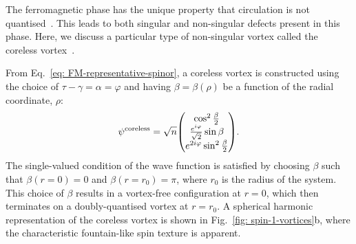 The ferromagnetic phase has the unique property that circulation is not
quantised~\cite{Kawaguchi2012}.
This leads to both singular and non-singular defects present in this phase.
Here, we discuss a particular type of non-singular vortex called the coreless
vortex~\cite{Martikainen2002, Leanhardt2003}.

From Eq.~\eqref{eq: FM-representative-spinor}, a coreless vortex is constructed
using the choice of \(\tau-\gamma = \alpha= \varphi \) and having
\(\beta = \beta(\rho)\) be a function of the radial coordinate, \(\rho \):
\begin{equation}
    \psi^\mathrm{coreless} = \sqrt{n}\mqty(
    \cos^2\frac{\beta}{2} \\
    \frac{e^{i\varphi}}{\sqrt{2}}\sin\beta \\
    e^{2i\varphi}\sin^2\frac{\beta}{2}
    ).
\end{equation}
The single-valued condition of the wave function is satisfied by choosing
\(\beta \) such that \(\beta(r=0) = 0\) and \(\beta(r=r_0) = \pi \), where
\(r_0\) is the radius of the system.
This choice of \(\beta \) results in a vortex-free configuration at \(r=0\),
which then terminates on a doubly-quantised vortex at \(r=r_0\).
A spherical harmonic representation of the coreless vortex is shown in
Fig.~\ref{fig: spin-1-vortices}b, where the characteristic fountain-like
spin texture is apparent.

